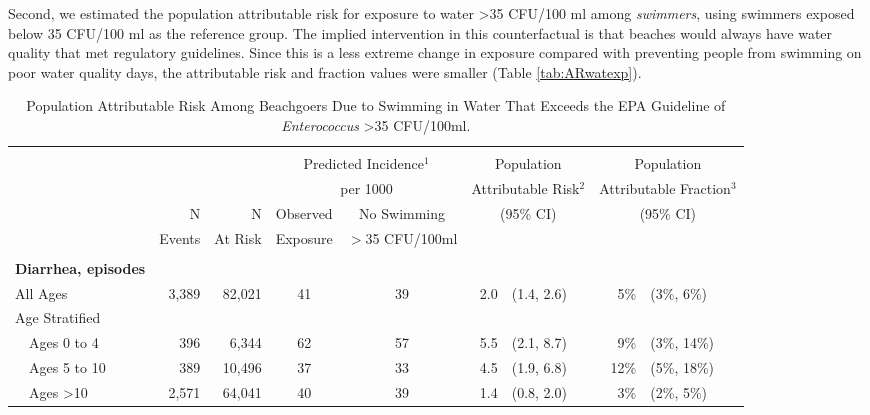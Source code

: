 \documentclass[12pt]{article}\usepackage[]{graphicx}\usepackage[]{color}
\begin{document}
Second, we estimated the population attributable risk for exposure to water >35 CFU/100 ml among \textit{swimmers}, using swimmers exposed below 35 CFU/100 ml as the reference group. The implied intervention in this counterfactual is that beaches would always have water quality that met regulatory guidelines.  Since this is a less extreme change in exposure compared with preventing people from swimming on poor water quality days, the attributable risk and fraction values were smaller (Table \ref{tab:ARwatexp}). 


\clearpage

\begin{table}[h!tb]
\begin{footnotesize}
\begin{center}
\begin{minipage}{0.8\textwidth}
\caption{Population Attributable Risk Among Beachgoers Due to Swimming in Water That Exceeds the EPA Guideline of \textit{Enterococcus} >35 CFU/100ml.   \label{tab:ARwatexpnoswim}}
\end{minipage}
\begin{tabular}{l rr cc rl rl}
 & \\
 &  &  & \multicolumn{2}{c}{Predicted Incidence$^1$}  & \multicolumn{2}{c}{Population}        & \multicolumn{2}{c}{Population}    \\
 & &                     & \multicolumn{2}{c}{per 1000}             & \multicolumn{2}{c}{Attributable Risk$^2$} & \multicolumn{2}{c}{Attributable Fraction$^3$} \\
\cline{4-5}
 & N        & N          & Observed  & No Swimming                 &  \multicolumn{2}{c}{(95\% CI)}        & \multicolumn{2}{c}{(95\% CI)}   \\
 &  Events  &  At Risk   & Exposure  & $>$35 CFU/100ml  \\
\hline
& \\
\textbf{Diarrhea, episodes} \\
 All Ages & 3,389 & 82,021 & 41 & 39 & 2.0 & (1.4, 2.6) & 5\% & (3\%, 6\%) \\ 
  
Age Stratified \\
 ~~Ages 0 to 4 & 396 & 6,344 & 62 & 57 & 5.5 & (2.1, 8.7) & 9\% & (3\%, 14\%) \\ 
 ~~Ages 5 to 10 & 389 & 10,496 & 37 & 33 & 4.5 & (1.9, 6.8) & 12\% & (5\%, 18\%) \\ 
 ~~Ages >10 & 2,571 & 64,041 & 40 & 39 & 1.4 & (0.8, 2.0) & 3\% & (2\%, 5\%) \\ 
  

\end{tabular}
\end{center}
\end{footnotesize}
\end{table}
\end{document}
